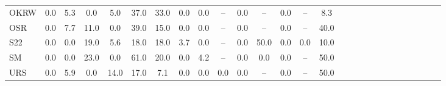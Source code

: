 \documentclass[varwidth=\maxdimen,border=1pt]{standalone}
\begin{document}
\begin{tabular*}{18cm}{ l @{\extracolsep{\fill}} *{26}{c} }
  OKRW & 0.0 & 5.3 & 0.0 & 5.0 & 37.0 & 33.0 & 0.0 & 0.0 & -- & 0.0 & -- & 0.0 & -- & 8.3 \\ 
  OSR & 0.0 & 7.7 & 11.0 & 0.0 & 39.0 & 15.0 & 0.0 & 0.0 & -- & 0.0 & -- & 0.0 & -- & 40.0 \\ 
  S22 & 0.0 & 0.0 & 19.0 & 5.6 & 18.0 & 18.0 & 3.7 & 0.0 & -- & 0.0 & 50.0 & 0.0 & 0.0 & 10.0 \\ 
  SM & 0.0 & 0.0 & 23.0 & 0.0 & 61.0 & 20.0 & 0.0 & 4.2 & -- & 0.0 & 0.0 & 0.0 & -- & 50.0 \\ 
  URS & 0.0 & 5.9 & 0.0 & 14.0 & 17.0 & 7.1 & 0.0 & 0.0 & 0.0 & 0.0 & -- & 0.0 & -- & 50.0 \\ 
        \hline
\end{tabular*}
 
\end{document}
